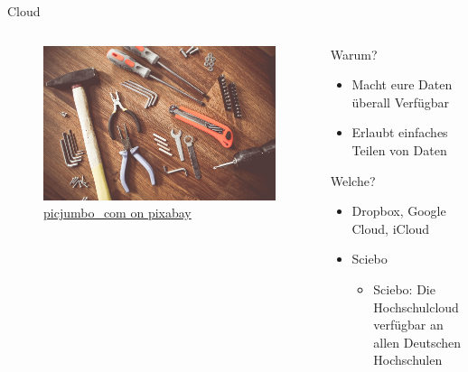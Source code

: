 \begin{frame}[t]{Cloud}
    \begin{columns}[t]   
        \begin{column}{0.29\textwidth}      
            \vspace{-3em}      
            \begin{figure}[t]
                \begin{flushleft}
                    \includegraphics[height=0.8\textheight,trim={0 0 25cm 0},clip]{graphics/tools-864983_1280.jpg}         
                    \caption*{\href{https://pixabay.com/de/photos/werkzeuge-konstruieren-boot-864983/}{picjumbo\_com on pixabay}}    
                \end{flushleft}                
            \end{figure}
        \end{column} 
        \begin{column}{0.7\textwidth}
            Warum?
            \begin{itemize}[]
                \item Macht eure Daten überall Verfügbar
                \item Erlaubt einfaches Teilen von Daten
            \end{itemize}
            Welche?
            \begin{itemize}[]
                \item Dropbox, Google Cloud, iCloud
                \item Sciebo
                \begin{itemize}
                    \item Sciebo: Die Hochschulcloud verfügbar an allen Deutschen Hochschulen

\end{itemize}
\end{itemize}
\end{column}
\end{columns}
\end{frame}
